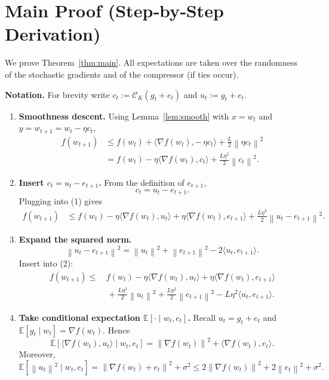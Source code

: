 \documentclass{article}
\newcommand{\E}{\mathbb{E}}
\newcommand{\norm}[1]{\left\|#1\right\|}
\newcommand{\topk}{\mathcal{C}_{K}}
\begin{document}
\section*{Main Proof (Step‑by‑Step Derivation)}
We prove Theorem~\ref{thm:main}.  All expectations are taken over the randomness
of the stochastic gradients and of the compressor (if ties occur).

\noindent\textbf{Notation.} For brevity write $c_{t}:=\topk(g_{t}+e_{t})$ and
$u_{t}:=g_{t}+e_{t}$.  

\begin{enumerate}
\item[Step 1.] \textbf{Smoothness descent.}
Using Lemma~\ref{lem:smooth} with $x=w_{t}$ and $y=w_{t+1}=w_{t}-\eta c_{t}$,
\[
\begin{aligned}
f(w_{t+1}) 
&\le f(w_{t})+\langle \nabla f(w_{t}),-\,\eta c_{t}\rangle
      +\frac{L}{2}\norm{\eta c_{t}}^{2} \\[1mm]
&= f(w_{t}) -\eta\langle\nabla f(w_{t}),c_{t}\rangle
      +\frac{L\eta^{2}}{2}\norm{c_{t}}^{2}. \tag{1}
\end{aligned}
\]

\item[Step 2.] \textbf{Insert $c_{t}=u_{t}-e_{t+1}$.}
From the definition of $e_{t+1}$,
\[
c_{t}=u_{t}-e_{t+1}.
\]
Plugging into (1) gives
\[
\begin{aligned}
f(w_{t+1})
&\le f(w_{t})-\eta\langle\nabla f(w_{t}),u_{t}\rangle
      +\eta\langle\nabla f(w_{t}),e_{t+1}\rangle
      +\frac{L\eta^{2}}{2}\norm{u_{t}-e_{t+1}}^{2}. \tag{2}
\end{aligned}
\]

\item[Step 3.] \textbf{Expand the squared norm.}
\[
\norm{u_{t}-e_{t+1}}^{2}
= \norm{u_{t}}^{2}+\norm{e_{t+1}}^{2}-2\langle u_{t},e_{t+1}\rangle .
\]
Insert into (2):
\[
\begin{aligned}
f(w_{t+1})
\le &\, f(w_{t})-\eta\langle\nabla f(w_{t}),u_{t}\rangle
      +\eta\langle\nabla f(w_{t}),e_{t+1}\rangle \\[1mm]
   &\;+\frac{L\eta^{2}}{2}\norm{u_{t}}^{2}
      +\frac{L\eta^{2}}{2}\norm{e_{t+1}}^{2}
      -L\eta^{2}\langle u_{t},e_{t+1}\rangle . \tag{3}
\end{aligned}
\]

\item[Step 4.] \textbf{Take conditional expectation $\E[\cdot\mid w_{t},e_{t}]$.}
Recall $u_{t}=g_{t}+e_{t}$ and $\E[g_{t}\mid w_{t}]=\nabla f(w_{t})$.
Hence
\[
\E\!\left[\langle\nabla f(w_{t}),u_{t}\rangle\mid w_{t},e_{t}\right]
 =\norm{\nabla f(w_{t})}^{2}+\langle\nabla f(w_{t}),e_{t}\rangle . \tag{4}
\]
Moreover,
\[
\E\!\left[\norm{u_{t}}^{2}\mid w_{t},e_{t}\right]
 = \norm{\nabla f(w_{t})+e_{t}}^{2}+\sigma^{2}
 \le 2\norm{\nabla f(w_{t})}^{2}+2\norm{e_{t}}^{2}+\sigma^{2}. \tag{5}
\]


\end{enumerate}
\end{document}
